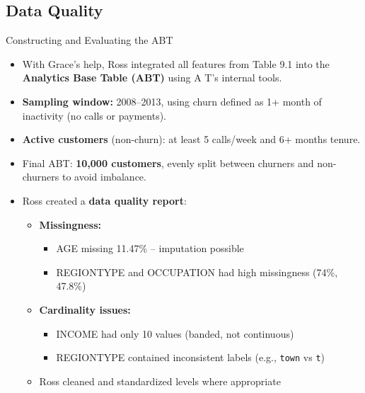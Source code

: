 \documentclass[aspectratio=169,xcolor=dvipsnames]{beamer}
\begin{document}
\subsection{Data Quality}
\begin{frame}{Constructing and Evaluating the ABT}

\begin{itemize}
  \item With Grace’s help, Ross integrated all features from Table 9.1 into the \textbf{Analytics Base Table (ABT)} using A T’s internal tools.
  \item \textbf{Sampling window:} 2008–2013, using churn defined as 1+ month of inactivity (no calls or payments).
  \item \textbf{Active customers} (non-churn): at least 5 calls/week and 6+ months tenure.
  \item Final ABT: \textbf{10,000 customers}, evenly split between churners and non-churners to avoid imbalance.
  \item Ross created a \textbf{data quality report}:
  \begin{itemize}
    \item \textbf{Missingness:} 
      \begin{itemize}
        \item AGE missing 11.47\% – imputation possible
        \item REGIONTYPE and OCCUPATION had high missingness (74\%, 47.8\%)
      \end{itemize}
    \item \textbf{Cardinality issues:} 
      \begin{itemize}
        \item INCOME had only 10 values (banded, not continuous)
        \item REGIONTYPE contained inconsistent labels (e.g., \texttt{town} vs \texttt{t})
      \end{itemize}
    \item Ross cleaned and standardized levels where appropriate
  \end{itemize}
\end{itemize}

\end{frame}
\end{document}
